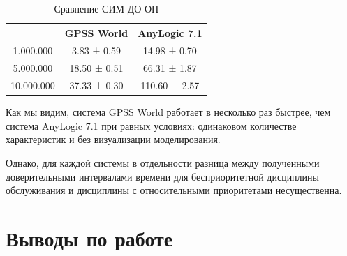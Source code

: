 \documentclass[a4paper,14pt]{report} %
\begin{document}
\begin{table}[h!]
\caption{Сравнение СИМ ДО ОП}
\begin{tabular}{|c|c|c|}
\hline
 & GPSS World & AnyLogic 7.1 \\
\hline
1.000.000 & 3.83 ± 0.59 & 14.98 ± 0.70 \\
\hline
5.000.000 & 18.50 ± 0.51 & 66.31 ± 1.87 \\
\hline
10.000.000 & 37.33 ± 0.30 & 110.60 ± 2.57 \\
\hline
\end{tabular}
\end{table} 

Как мы видим, система GPSS World работает в несколько раз быстрее, чем система AnyLogic 7.1 при равных условиях: одинаковом количестве характеристик и без визуализации моделирования. 

Однако, для каждой системы в отдельности разница между полученными доверительными интервалами времени для бесприоритетной дисциплины обслуживания и дисциплины с относительными приоритетами несущественна.
\chapter{Выводы по работе}
\end{document}

